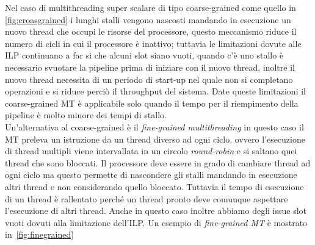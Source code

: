 Nel caso di multithreading super scalare di tipo coarse-grained come quello in \figurename	\,\ref{fig:croasgrained} i lunghi stalli vengono nascosti mandando in esecuzione un nuovo thread che occupi le risorse del processore, questo meccanismo riduce il numero di cicli in cui il processore è inattivo; tuttavia le limitazioni dovute alle ILP continuano a far si che alcuni slot siano vuoti, quando c'è uno stallo è necessario svuotare la pipeline prima di iniziare con il nuovo thread, inoltre il nuovo thread necessita di un periodo di start-up nel quale non si completano operazioni e si riduce perciò il throughput del sistema. Date queste limitazioni il coarse-grained MT è applicabile solo quando il tempo per il riempimento della pipeline è molto minore dei tempi di stallo.\\
Un'alternativa al coarse-grained è il \emph{fine-grained multithreading} in questo caso il MT preleva un istruzione da un thread diverso ad ogni ciclo, ovvero l'esecuzione di thread multipli viene intervallata in un circolo \emph{round-robin} e si saltano quei thread che sono bloccati. Il processore deve essere in grado di cambiare thread ad ogni ciclo ma questo permette di nascondere gli stalli mandando in esecuzione altri thread e non considerando quello bloccato. Tuttavia il tempo di esecuzione di un thread è rallentato perché un thread pronto deve comunque aspettare l'esecuzione di altri thread. Anche in questo caso inoltre abbiamo degli issue slot vuoti dovuti alla limitazione dell'ILP. Un esempio di \emph{fine-grained MT} è mostrato in \figurename\,\ref{fig:finegrained}
